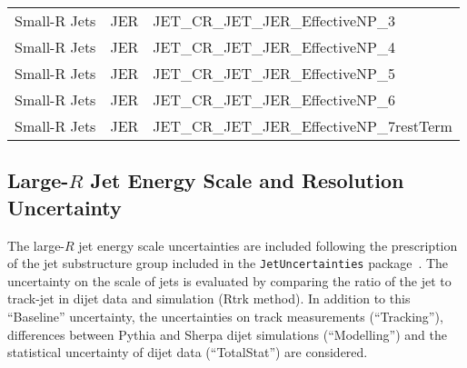 \begin{table}[!hp]
\begin{center}
\begin{tabular}{|l|l|l|}
      Small-R Jets  & JER                  &  JET\_CR\_JET\_JER\_EffectiveNP\_3           \\
      Small-R Jets  & JER                  &  JET\_CR\_JET\_JER\_EffectiveNP\_4           \\
      Small-R Jets  & JER                  &  JET\_CR\_JET\_JER\_EffectiveNP\_5           \\
      Small-R Jets  & JER                  &  JET\_CR\_JET\_JER\_EffectiveNP\_6           \\
      Small-R Jets  & JER                  &  JET\_CR\_JET\_JER\_EffectiveNP\_7restTerm   \\
      \hline
  \end{tabular}
  \end{center}
\end{table}

\subsection*{Large-$R$ Jet Energy Scale and Resolution Uncertainty}
\label{sec:fatjetUncert}

The large-$R$ jet energy scale uncertainties are included following the prescription of the
jet substructure group included in the \texttt{JetUncertainties} package~\cite{JSSrecommendation}.
The uncertainty on the \pt scale of jets is evaluated by
comparing the ratio of the jet \pt to track-jet \pt in dijet data and simulation (Rtrk method).
In addition to this ``Baseline'' uncertainty, the uncertainties on track measurements (``Tracking''), differences between Pythia and Sherpa dijet simulations (``Modelling'') and the statistical uncertainty of dijet data (``TotalStat'') are considered.


